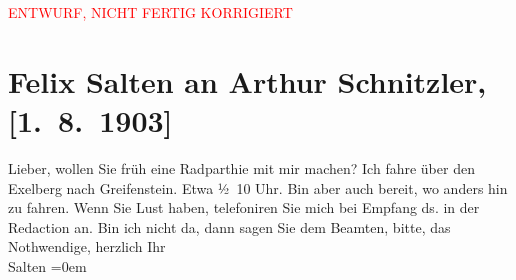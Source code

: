 
\begin{center}
            \textcolor{red}{ENTWURF, NICHT FERTIG KORRIGIERT}
                      \end{center}
            
         \renewcommand{\erwaehnteInstitutionen}{Institutionen: Die Zeit}
         \renewcommand{\erwaehnteOrte}{Orte: Exelberg, Greifenstein, Wien}
         \renewcommand{\erwaehnteWerke}{}
               \section[Felix Salten an Arthur Schnitzler, {[}1. 8. 1903{]}]{ Felix Salten an Arthur Schnitzler, {[}1. 8. 1903{]}}\nopagebreak{}\rehead{ }\begin{ledgroupsized}[t]{13cm}\normalsize\beginnumbering \toendnotes[C]{\smallbreak\pagebreak[2]} 
\toendnotes[C]{\smallbreak}\pstart
           \noindent{}{\pb}Lieber, wollen Sie \label{K_L03341-1v}\label{K_L03341-1h} früh eine Radparthie mit mir machen? Ich fahre über den Exelberg nach Greifenstein. Etwa ½ 10 Uhr. Bin aber auch bereit, wo anders
               hin zu fahren. Wenn Sie Lust haben, telefoniren Sie mich bei Empfang ds. in der Redaction an. Bin ich nicht da,
               dann sagen Sie dem Beamten, bitte, das Nothwendige, \pend
           \pstart
           herzlich Ihr {\\[\baselineskip]}\spacefill\mbox{Salten}\pend
           \leftskip=0em{}
         
         \endnumbering{}\end{ledgroupsized}\begin{anhang}\end{anhang}\newcommand{\dateiname}{L03341}\newcommand{\titel}{Felix Salten an Arthur Schnitzler, [1. 8. 1903]}\newcommand{\editorInnen}{Martin Anton Müller und Laura Untner}
      